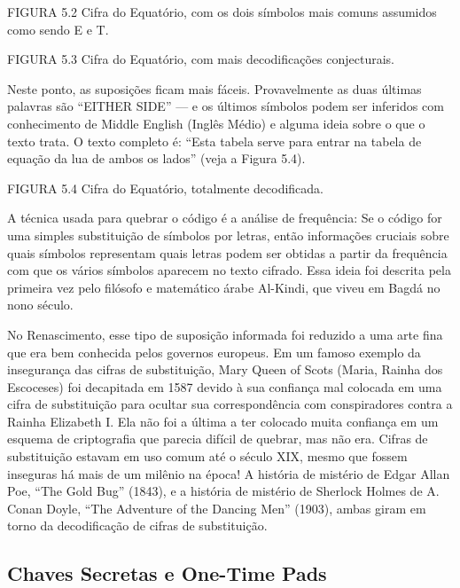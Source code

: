 \documentclass{book}
\begin{document}
FIGURA 5.2 Cifra do Equatório, com os dois símbolos mais comuns assumidos como sendo E e T.

FIGURA 5.3 Cifra do Equatório, com mais decodificações conjecturais.

Neste ponto, as suposições ficam mais fáceis. Provavelmente as duas últimas palavras são ``EITHER SIDE'' --- e os últimos símbolos podem ser inferidos com conhecimento de Middle English (Inglês Médio) e alguma ideia sobre o que o texto trata. O texto completo é: ``Esta tabela serve para entrar na tabela de equação da lua de ambos os lados'' (veja a Figura 5.4).

FIGURA 5.4 Cifra do Equatório, totalmente decodificada.

A técnica usada para quebrar o código é a análise de frequência: Se o código for uma simples substituição de símbolos por letras, então informações cruciais sobre quais símbolos representam quais letras podem ser obtidas a partir da frequência com que os vários símbolos aparecem no texto cifrado. Essa ideia foi descrita pela primeira vez pelo filósofo e matemático árabe Al-Kindi, que viveu em Bagdá no nono século.

No Renascimento, esse tipo de suposição informada foi reduzido a uma arte fina que era bem conhecida pelos governos europeus. Em um famoso exemplo da insegurança das cifras de substituição, Mary Queen of Scots (Maria, Rainha dos Escoceses) foi decapitada em 1587 devido à sua confiança mal colocada em uma cifra de substituição para ocultar sua correspondência com conspiradores contra a Rainha Elizabeth I. Ela não foi a última a ter colocado muita confiança em um esquema de criptografia que parecia difícil de quebrar, mas não era. Cifras de substituição estavam em uso comum até o século XIX, mesmo que fossem inseguras há mais de um milênio na época! A história de mistério de Edgar Allan Poe, ``The Gold Bug'' (1843), e a história de mistério de Sherlock Holmes de A. Conan Doyle, ``The Adventure of the Dancing Men'' (1903), ambas giram em torno da decodificação de cifras de substituição.


\subsection{Chaves Secretas e One-Time Pads}
\label{segredos:one-time-pads}
\end{document}
